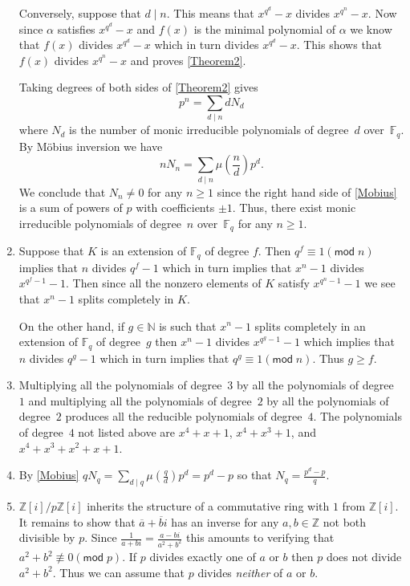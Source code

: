 \documentclass[12pt]{article}
\renewcommand{\pmod}[1]{\left(\mathsf{mod}\;#1\right)}
\begin{document}
\begin{enumerate}
Conversely, suppose that $d\mid n$. This means that $x^{q^d}-x$
divides $x^{q^n}-x$. Now since $\alpha$ satisfies $x^{q^d}-x$
and $f\left(x\right)$ is the minimal polynomial of $\alpha$
we know that $f\left(x\right)$ divides $x^{q^d}-x$ which in
turn divides $x^{q^d}-x$. This shows that $f\left(x\right)$
divides $x^{q^n}-x$ and proves \autoref{Theorem2}.

Taking degrees of both sides of \autoref{Theorem2} gives
\[p^n=\sum_{d\mid n}dN_d\]
where $N_d$ is the number of monic irreducible polynomials
of degree~$d$ over~$\mathbb{F}_q$.
By M\"obius inversion we have
\begin{equation}\label{Mobius}
nN_n=\sum_{d\mid n}\mu\left(\frac{n}{d}\right)p^d.
\end{equation}
We conclude that $N_n\ne 0$ for any $n\ge 1$ since
the right hand side of \autoref{Mobius} is a sum
of powers of $p$ with coefficients $\pm 1$.
Thus, there exist monic irreducible polynomials of degree~$n$
over~$\mathbb{F}_q$ for any $n\ge 1$.

\item %
Suppose that $K$ is an extension of $\mathbb{F}_q$ of degree $f$. Then
$q^f\equiv 1\pmod{n}$ implies that $n$ divides $q^f-1$
which in turn implies that $x^n-1$ divides $x^{q^f-1}-1$.
Then since all the nonzero elements of $K$ satisfy $x^{q^n-1}-1$
we see that $x^n-1$ splits completely in $K$.

On the other hand, if $g\in\mathbb{N}$ is such that
$x^n-1$ splits completely in an extension of $\mathbb{F}_q$
of degree~$g$ then $x^n-1$ divides $x^{q^g-1}-1$
which implies that $n$ divides $q^g-1$ which in turn implies
that $q^g\equiv 1\pmod{n}$. Thus $g\ge f$.

\item %
Multiplying all the polynomials of degree~$3$ by all the polynomials
of degree~$1$ and multiplying all the polynomials of degree~$2$
by all the polynomials of degree~$2$
produces all the reducible polynomials of degree~$4$.
The polynomials of degree~$4$ not listed above are
$x^4+x+1$, $x^4+x^3+1$, and $x^4+x^3+x^2+x+1$.

\item %
By \autoref{Mobius}
$qN_q=\sum_{d\mid q}\mu\left(\frac{q}{d}\right)p^d
=p^d-p$ so that $N_q=\frac{p^d-p}{q}$.

\item %
$\mathbb{Z}\left[i\right]/p\mathbb{Z}\left[i\right]$
inherits the structure of a commutative ring with $1$ from
$\mathbb{Z}\left[i\right]$. It remains to show that
$\overline{a}+\overline{b}i$ has an inverse
for any $a,b\in\mathbb{Z}$ not both divisible by $p$.
Since $\frac{1}{a+bi}=\frac{a-bi}{a^2+b^2}$ this amounts to
verifying that $a^2+b^2\not\equiv 0\pmod{p}$.
If $p$ divides exactly one of $a$ or $b$ then $p$
does not divide $a^2+b^2$. Thus we can assume
that $p$ divides {\em neither} of $a$ or $b$.


\end{enumerate}
\end{document}
